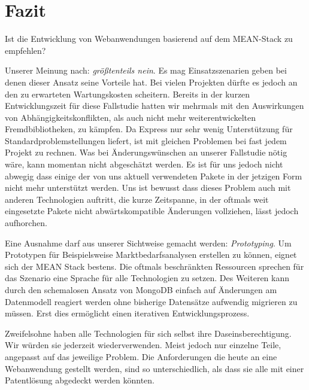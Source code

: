 \chapter{Fazit}
\label{fazit}

Ist die Entwicklung von Webanwendungen basierend auf dem MEAN-Stack zu
empfehlen?

Unserer Meinung nach: \emph{größtenteils nein}. Es mag Einsatzszenarien
geben bei denen dieser Ansatz seine Vorteile hat. Bei vielen Projekten
dürfte es jedoch an den zu erwarteten Wartungskosten scheitern. Bereits
in der kurzen Entwicklungszeit für diese Fallstudie hatten wir mehrmals
mit den Auswirkungen von Abhängigkeitskonflikten, als auch nicht mehr
weiterentwickelten Fremdbibliotheken, zu kämpfen. Da Express nur sehr
wenig Unterstützung für Standardproblemstellungen liefert, ist mit
gleichen Problemen bei fast jedem Projekt zu rechnen. Was bei
Änderungswünschen an unserer Fallstudie nötig wäre, kann momentan nicht
abgeschätzt werden. Es ist für uns jedoch nicht abwegig dass einige der
von uns aktuell verwendeten Pakete in der jetzigen Form nicht mehr
unterstützt werden. Uns ist bewusst dass dieses Problem auch mit anderen
Technologien auftritt, die kurze Zeitspanne, in der oftmals weit
eingesetzte Pakete nicht abwärtskompatible Änderungen vollziehen, lässt
jedoch aufhorchen.

Eine Ausnahme darf aus unserer Sichtweise gemacht werden:
\emph{Prototyping}. Um Prototypen für Beispielsweise
Marktbedarfsanalysen erstellen zu können, eignet sich der MEAN Stack
bestens. Die oftmals beschränkten Ressourcen sprechen für das Szenario
eine Sprache für alle Technologien zu setzen. Des Weiteren kann durch
den schemalosen Ansatz von MongoDB einfach auf Änderungen am Datenmodell
reagiert werden ohne bisherige Datensätze aufwendig migrieren zu müssen.
Erst dies ermöglicht einen iterativen Entwicklungsprozess.

Zweifelsohne haben alle Technologien für sich selbst ihre
Daseinsberechtigung. Wir würden sie jederzeit wiederverwenden. Meist
jedoch nur einzelne Teile, angepasst auf das jeweilige Problem. Die
Anforderungen die heute an eine Webanwendung gestellt werden, sind so
unterschiedlich, als dass sie alle mit einer Patentlösung abgedeckt
werden könnten.
